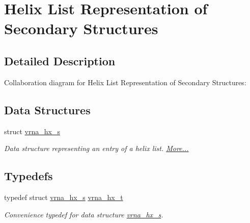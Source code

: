 \hypertarget{group__struct__utils__helix__list}{}\section{Helix List Representation of Secondary Structures}
\label{group__struct__utils__helix__list}


\subsection{Detailed Description}
Collaboration diagram for Helix List Representation of Secondary Structures\+:
\subsection*{Data Structures}
\begin{DoxyCompactItemize}
\item 
struct \mbox{\hyperlink{group__struct__utils__helix__list_structvrna__hx__s}{vrna\+\_\+hx\+\_\+s}}
\begin{DoxyCompactList}\small\item\em Data structure representing an entry of a helix list.  \mbox{\hyperlink{group__struct__utils__helix__list_structvrna__hx__s}{More...}}\end{DoxyCompactList}\end{DoxyCompactItemize}
\subsection*{Typedefs}
\begin{DoxyCompactItemize}
\item 
\mbox{\label{group__struct__utils__helix__list_ga877363f3a1703b53ecd025c6fcf897a0}} 
typedef struct \mbox{\hyperlink{group__struct__utils__helix__list_structvrna__hx__s}{vrna\+\_\+hx\+\_\+s}} \mbox{\hyperlink{group__struct__utils__helix__list_ga877363f3a1703b53ecd025c6fcf897a0}{vrna\+\_\+hx\+\_\+t}}
\begin{DoxyCompactList}\small\item\em Convenience typedef for data structure \mbox{\hyperlink{group__struct__utils__helix__list_structvrna__hx__s}{vrna\+\_\+hx\+\_\+s}}. \end{DoxyCompactList}\end{DoxyCompactItemize}
